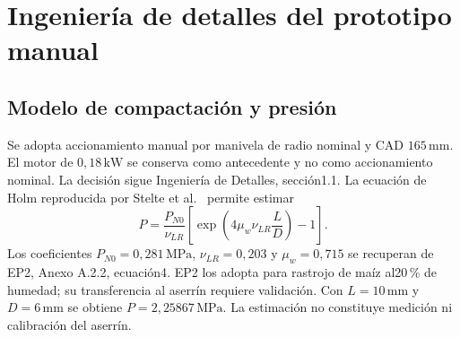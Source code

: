 \section{Ingeniería de detalles del prototipo manual}
\subsection{Modelo de compactación y presión}
Se adopta accionamiento manual por manivela de radio nominal y CAD $165\,\mathrm{mm}$.
El motor de $0,18\,\mathrm{kW}$ se conserva como antecedente y no como accionamiento nominal.
La decisión sigue Ingeniería de Detalles, sección1.1\parencite{equipo_detalles_prototipo_2026}.
La ecuación de Holm reproducida por Stelte et al.\ \parencite{stelte_presion_2011} permite estimar
\begin{equation}P=\frac{P_{N0}}{\nu_{LR}}\left[\exp\left(4\mu_w\nu_{LR}\frac{L}{D}\right)-1\right].\end{equation}
Los coeficientes $P_{N0}=0,281\,\mathrm{MPa}$, $\nu_{LR}=0,203$ y $\mu_w=0,715$
se recuperan de EP2, Anexo A.2.2, ecuación4\parencite{equipo_entrega2_2026}.
EP2 los adopta para rastrojo de maíz al20\,\% de humedad; su transferencia al aserrín requiere validación.
Con $L=10\,\mathrm{mm}$ y $D=6\,\mathrm{mm}$ se obtiene $P=2,25867\,\mathrm{MPa}$.
La estimación no constituye medición ni calibración del aserrín.
